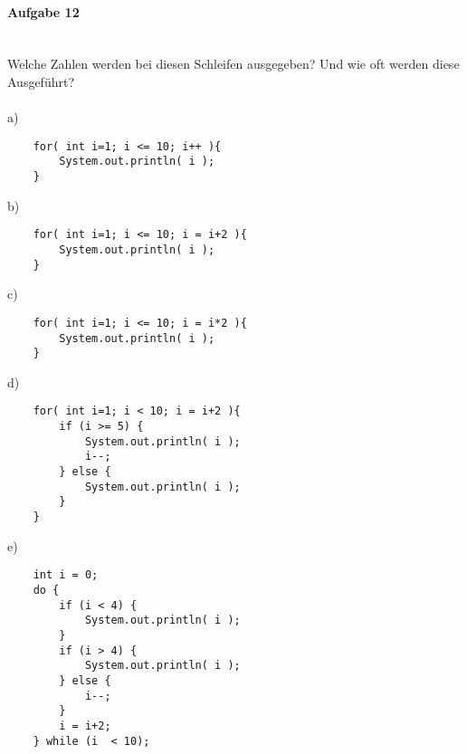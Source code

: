 \documentclass[12pt,a4paper,ngerman]{scrartcl}
\begin{document}
	\paragraph{Aufgabe 12}\mbox{}\\
	Welche Zahlen werden bei diesen Schleifen ausgegeben? Und wie oft werden diese Ausgeführt?
	\\\\
	a) \begin{lstlisting}
	for( int i=1; i <= 10; i++ ){
		System.out.println( i );
	} 
	\end{lstlisting}
	b) \begin{lstlisting}
	for( int i=1; i <= 10; i = i+2 ){
		System.out.println( i );
	}  
	\end{lstlisting}
	c) \begin{lstlisting}
	for( int i=1; i <= 10; i = i*2 ){
		System.out.println( i );
	} 
	\end{lstlisting}
	d) \begin{lstlisting}
	for( int i=1; i < 10; i = i+2 ){
		if (i >= 5) {
			System.out.println( i );
			i--;
		} else {
			System.out.println( i );
		} 
	} 
	\end{lstlisting}
	\newpage
	e) \begin{lstlisting}
	int i = 0;
	do { 
		if (i < 4) {
			System.out.println( i );
		}
		if (i > 4) {
			System.out.println( i );
		} else {
			i--;
		} 
		i = i+2;
	} while (i  < 10);  
	\end{lstlisting}
	
\end{document}
